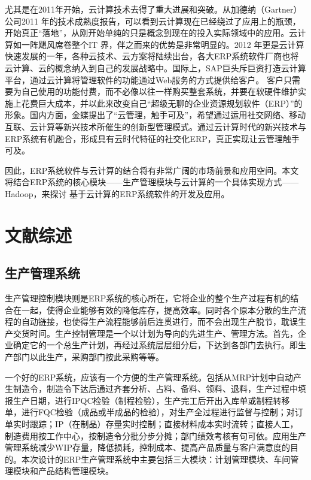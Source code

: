 \documentclass{Proposal}
\begin{document}
尤其是在2011年开始，云计算技术去得了重大进展和突破。从加德纳（Gartner）公司2011 年的技术成熟度报告，可以看到云计算现在已经绕过了应用上的瓶颈，开始真正“落地”，从刚开始单纯的只是概念到现在的投入实际领域中的应用。云计算如一阵飓风席卷整个IT 界，伴之而来的优势是非常明显的。2012 年更是云计算快速发展的一年，各种云技术、云方案将陆续出台，各大ERP系统软件厂商也将云计算、云的概念纳入到自己的发展战略中。国际上，SAP巨头斥巨资打造云计算平台，通过云计算将管理软件的功能通过Web服务的方式提供给客户。 客户只需要为自己使用的功能付费，而不必像以往一样购买整套系统，并要在软硬件维护实施上花费巨大成本，并以此来改变自己“超级无聊的企业资源规划软件（ERP）”的形象。国内方面，金蝶提出了“云管理，触手可及”，希望通过运用社交网络、移动互联、云计算等新兴技术所催生的创新型管理模式。通过云计算时代的新兴技术与ERP系统有机融合，形成具有云时代特征的社交化ERP，真正实现让云管理触手可及。

因此，ERP系统软件与云计算的结合将有非常广阔的市场前景和应用空间。本文将结合ERP系统的核心模块——生产管理模块与云计算的一个具体实现方式——Hadoop，来探讨
基于云计算的ERP系统软件的开发及应用。

\section{文献综述}

\subsection{生产管理系统}

生产管理控制模块则是ERP系统的核心所在，它将企业的整个生产过程有机的结合在一起，使得企业能够有效的降低库存，提高效率。同时各个原本分散的生产流程的自动链接，也使得生产流程能够前后连贯进行，而不会出现生产脱节，耽误生产交货时间。生产控制管理是一个以计划为导向的先进生产、管理方法。首先，企业确定它的一个总生产计划，再经过系统层层细分后，下达到各部门去执行。即生产部门以此生产，采购部门按此采购等等。

一个好的ERP系统，应该有一个方便的生产管理系统。包括从MRP计划中自动产生制造令，制造令下达后通过齐套分析、占料、备料、领料、退料，生产过程中填报生产日期，进行IPQC检验（制程检验），生产完工后开出入库单或制程转移单，进行FQC检验（成品或半成品的检验），对生产全过程进行监督与控制；对订单实时跟踪；IP（在制品）存量实时控制；直接材料成本实时流转；直接人工，制造费用按工作中心，按制造令分批分步分摊；部门绩效考核有句可依。应用生产管理系统减少WIP存量，降低损耗，控制成本、提高产品质量与客户满意度的目的。本次设计的ERP生产管理系统中主要包括三大模块：计划管理模块、车间管理模块和产品结构管理模块。
\end{document}
